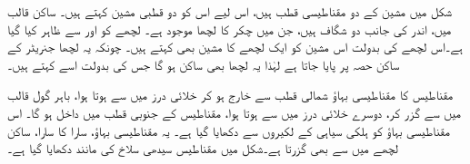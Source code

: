 شکل  میں  مشین کے دو مقناطیسی  قطب ہیں، اس لیے اس کو دو قطبی مشین کہتے ہیں۔ ساکن قالب میں، اندر کی جانب دو  شگاف ہیں، جن میں   چکر کا لچھا موجود ہے۔ لچھے کو  اور  سے ظاہر کیا گیا ہے۔اس لچھے کی بدولت اس مشین کو ایک لچھے کا مشین بھی کہتے ہیں۔ چونکہ یہ لچھا جنریٹر کے ساکن حصہ پر پایا جاتا ہے لہٰذا  یہ لچھا  بھی ساکن  ہو گا جس کی بدولت اسے   کہتے ہیں۔

مقناطیس کا مقناطیسی بہاؤ شمالی قطب   سے خارج ہو کر خلائی درز میں سے ہوتا ہوا، باہر گول قالب میں سے گزر کر، دوسرے خلائی درز میں سے ہوتا ہوا، مقناطیس کے جنوبی قطب    میں داخل ہو گا۔ اس مقناطیسی بہاؤ کو  ہلکی سیاہی کے لکیروں سے دکھایا گیا ہے۔  یہ  مقناطیسی بہاؤ، سارا کا سارا، ساکن لچھے میں سے بھی گزرتا ہے۔شکل   میں مقناطیس سیدھی سلاخ کی مانند دکھایا گیا ہے۔

